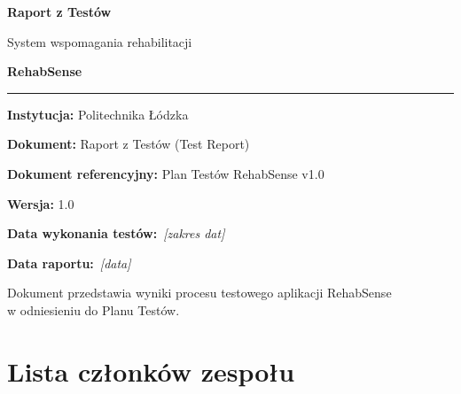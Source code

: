 \documentclass[11pt,a4paper]{article}
\newcommand{\luka}[1]{\colorbox{lukacol}{\,\textit{[#1]}\,}}
\begin{document}
\begin{titlepage}
\centering
\vspace*{2cm}

{\Huge\bfseries\color{primary} Raport z Testów\par}
\vspace{0.5cm}
{\LARGE System wspomagania rehabilitacji\par}
\vspace{0.3cm}
{\Huge\bfseries RehabSense\par}

\vspace{1.2cm}
\rule{0.7\textwidth}{1.2pt}\par
\vspace{1.2cm}

{\large\textbf{Instytucja:} Politechnika Łódzka\par}
\vspace{0.4cm}
{\large\textbf{Dokument:} Raport z Testów (Test Report)\par}
\vspace{0.4cm}
{\large\textbf{Dokument referencyjny:} Plan Testów RehabSense v1.0\par}
\vspace{0.4cm}
{\large\textbf{Wersja:} 1.0\par}
\vspace{0.4cm}
{\large\textbf{Data wykonania testów:} \luka{zakres dat}\par}
\vspace{0.4cm}
{\large\textbf{Data raportu:} \luka{data}\par}

\vfill
{\small Dokument przedstawia wyniki procesu testowego aplikacji RehabSense\\ w odniesieniu do Planu Testów.}
\end{titlepage}

\section*{Lista członków zespołu}
\end{document}
